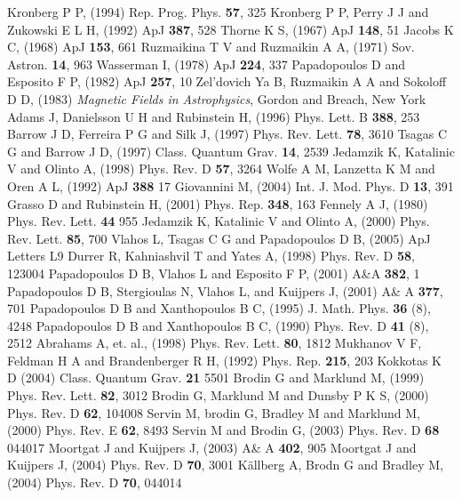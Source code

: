 \documentclass[prd,twocolumn,showpacs,preprintnumbers,amsmath,amssy mb]{revtex4}
\begin{document}
\begin{thebibliography}{99}

Kronberg P P, (1994) Rep. Prog. Phys. {\bf 57}, 325
Kronberg P P, Perry J J and Zukowski E L H, (1992) 
ApJ {\bf 387}, 528
Thorne K S, (1967) ApJ {\bf 148}, 51
Jacobs K C, (1968) ApJ {\bf 153}, 661
Ruzmaikina T V and Ruzmaikin A A, (1971) Sov. Astron. 
{\bf 14}, 963 
Wasserman I, (1978) ApJ {\bf 224}, 337
Papadopoulos D and Esposito F P, (1982) ApJ {\bf 257}, 10
Zel'dovich Ya B, Ruzmaikin A A and Sokoloff D D, (1983) 
{\it Magnetic Fields in Astrophysics}, Gordon and Breach, New York 
Adams J, Danielsson U H and Rubinstein H, (1996) 
Phys. Lett. B {\bf 388}, 253
Barrow J D, Ferreira P G and Silk J, (1997) Phys. Rev. Lett. 
{\bf 78}, 3610
Tsagas C G and Barrow J D, (1997) Class. Quantum Grav. 
{\bf 14}, 2539
Jedamzik K, Katalinic V and Olinto A, (1998) 
Phys. Rev. D {\bf 57}, 3264
Wolfe A M, Lanzetta K M and Oren A L, (1992) 
ApJ {\bf 388} 17
Giovannini M, (2004) Int. J. Mod. Phys. D 
{\bf 13}, 391
Grasso D and Rubinstein H, (2001) Phys. Rep. 
{\bf 348}, 163
Fennely A J, (1980) Phys. Rev. Lett. 
{\bf 44} 955
Jedamzik K, Katalinic V and Olinto A, (2000) 
Phys. Rev. Lett. {\bf 85}, 700 
Vlahos L, Tsagas C G and Papadopoulos D B, (2005) 
ApJ Letters L9
Durrer R, Kahniashvil T and Yates A, (1998) 
Phys. Rev. D {\bf 58}, 123004
Papadopoulos D B, Vlahos L and Esposito F P, 
(2001) A\&A {\bf 382}, 1
Papadopoulos D B, Stergioulas N, Vlahos L, 
and Kuijpers J, (2001) A\& A {\bf 377}, 701 
Papadopoulos D B and Xanthopoulos B C, (1995) 
J. Math. Phys. {\bf 36} (8), 4248
Papadopoulos D B and Xanthopoulos B C, (1990)
Phys. Rev. D {\bf 41} (8), 2512 
Abrahams A, et. al., (1998) 
Phys. Rev. Lett. {\bf 80}, 1812
Mukhanov V F, Feldman H A and Brandenberger R H, 
(1992) Phys. Rep. {\bf 215}, 203
Kokkotas K D (2004) Class. Quantum Grav. 
{\bf 21} 5501
Brodin G and Marklund M, (1999) Phys. Rev. Lett. 
{\bf 82}, 3012 
Brodin G, Marklund M and Dunsby P K S, (2000) 
Phys. Rev. D {\bf 62}, 104008
Servin M, brodin G, Bradley M and Marklund M, 
(2000) Phys. Rev. E {\bf 62}, 8493
Servin M and Brodin G, (2003) 
Phys. Rev. D {\bf 68} 044017
Moortgat J and Kuijpers J, (2003) A\& A 
{\bf 402}, 905
Moortgat J and Kuijpers J, (2004) Phys. Rev. 
D {\bf 70}, 3001 
K\"{a}llberg A, Brodn G and Bradley M, (2004) 
Phys. Rev. D {\bf 70}, 044014



\end{thebibliography}
\end{document}
